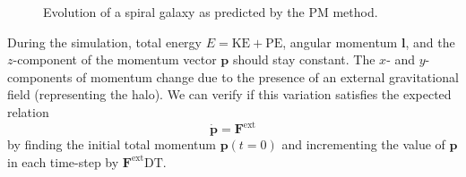 \begin{figure}[htp]
    \caption{Evolution of a spiral galaxy as predicted by the PM method.}
    \label{fig:spiral-galaxy-evolution-pm}
\end{figure}

During the simulation, total energy $E = \textrm{KE} + \textrm{PE}$, angular momentum $\mathbf{l}$, and the $z$-component of the momentum vector $\mathbf{p}$ should stay constant.
The $x$- and $y$-components of momentum change due to the presence of an external gravitational field (representing the halo).
We can verify if this variation satisfies the expected relation
\begin{equation}\label{eq:expected-momentum-change}
    \dot{\mathbf{p}} = \mathbf{F}^\text{ext}
\end{equation}
by finding the initial total momentum $\mathbf{p}(t = 0)$ and incrementing the value of $\mathbf{p}$ in each time-step by $\mathbf{F}^\text{ext}\textrm{DT}$.

